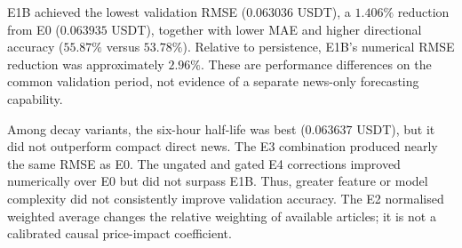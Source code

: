 \begin{table}[!htbp]
\centering\small
\caption{Complete matched XRP validation ranking: 2,136 identical origins, exact 24-hour targets and five seeds per neural configuration. SD measures between-seed variation; it is not a confidence interval over independent market periods.}
\label{tab:Table1}
\end{table}

E1B achieved the lowest validation RMSE ($0.063036$ USDT), a $1.406\%$ reduction from E0 ($0.063935$ USDT), together with lower MAE and higher directional accuracy ($55.87\%$ versus $53.78\%$). Relative to persistence, E1B's numerical RMSE reduction was approximately $2.96\%$. These are performance differences on the common validation period, not evidence of a separate news-only forecasting capability.

Among decay variants, the six-hour half-life was best ($0.063637$ USDT), but it did not outperform compact direct news. The E3 combination produced nearly the same RMSE as E0. The ungated and gated E4 corrections improved numerically over E0 but did not surpass E1B. Thus, greater feature or model complexity did not consistently improve validation accuracy. The E2 normalised weighted average changes the relative weighting of available articles; it is not a calibrated causal price-impact coefficient.

